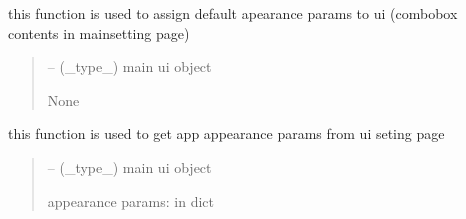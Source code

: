 \documentclass[letterpaper,10pt,english]{sphinxmanual}
\begin{document}
\begin{savenotes}\begin{fulllineitems}
\label{\detokenize{setting/backend/mainsetting_funcs:oxin.backend.mainsetting_funcs.assign_appearance_existing_params_to_ui}}
\pysigstartsignatures
{}
\pysigstopsignatures
\sphinxAtStartPar
this function is used to assign default apearance params to ui (combobox contents in main\sphinxhyphen{}setting page)
\begin{quote}\begin{description}
\sphinxAtStartPar
{} – (\_type\_) main ui object

\sphinxAtStartPar
None

\end{description}\end{quote}

\end{fulllineitems}\end{savenotes}


\begin{savenotes}\begin{fulllineitems}
\label{\detokenize{setting/backend/mainsetting_funcs:oxin.backend.mainsetting_funcs.get_appearance_params_from_ui}}
\pysigstartsignatures
{}
\pysigstopsignatures
\sphinxAtStartPar
this function is used to get app appearance params from ui seting page
\begin{quote}\begin{description}
\sphinxAtStartPar
{} – (\_type\_) main ui object

\sphinxAtStartPar
appearance params: in dict

\end{description}\end{quote}

\end{fulllineitems}\end{savenotes}
\end{document}
